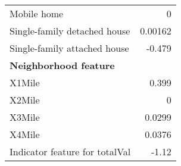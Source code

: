 \begin{table}[H]
\begin{tabular}{|p{6cm}|r|}
		Mobile home  & 0 \\
		Single-family detached house  & 0.00162 \\ 
		Single-family attached house  & -0.479 \\
		\hline
		\textbf{Neighborhood feature} & \\
		X1Mile & 0.399 \\ 
		X2Mile &    0 \\ 
		X3Mile & 0.0299 \\ 
		X4Mile & 0.0376 \\ 
		\hline
		Indicator feature for totalVal & -1.12 \\ 
		\hline
	\end{tabular}
	\label{tab: model coefficients}
\end{table}